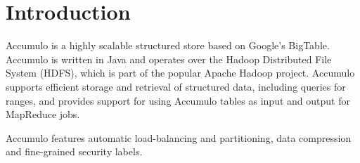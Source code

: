 \chapter{Introduction}
Accumulo is a highly scalable structured store based on Google's BigTable.
Accumulo is written in Java and operates over the Hadoop Distributed File System
(HDFS), which is part of the popular Apache Hadoop project. Accumulo supports
efficient storage and retrieval of structured data, including queries for ranges, and
provides support for using Accumulo tables as input and output for MapReduce
jobs.

Accumulo features automatic load-balancing and partitioning, data compression
and fine-grained security labels.

